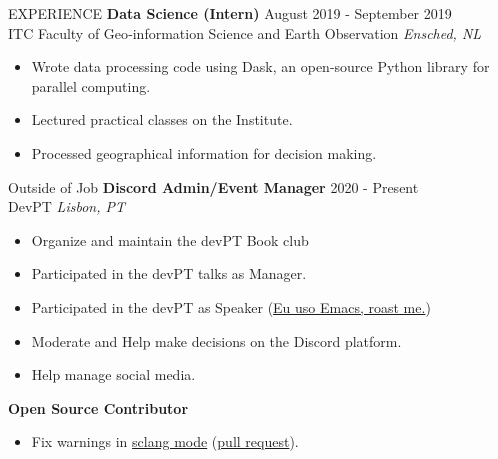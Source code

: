 \documentclass{resume} %
\begin{document}
\begin{rSection}{EXPERIENCE}
  \textbf{Data Science (Intern)} \hfill August 2019 - September 2019 \\
  ITC Faculty of Geo‑information Science and Earth Observation \hfill \textit{Ensched, NL}
  \begin{itemize}
    \itemsep -3pt {} 
  \item Wrote data processing code using Dask, an open-source Python library for parallel computing.
  \item Lectured practical classes on the Institute.
  \item Processed geographical information for decision making.
  \end{itemize}
\end{rSection} 


\begin{rSection}{Outside of Job}  
  \textbf{Discord Admin/Event Manager} \hfill 2020 - Present \\
  DevPT \hfill \textit{Lisbon, PT}
  \begin{itemize}
    \itemsep -3pt {}
  \item Organize and maintain the devPT Book club
  \item Participated in the devPT talks as Manager.
  \item Participated in the devPT as Speaker (\href{https://www.youtube.com/watch?v=p7FrTaukioI&t=2693s}{Eu uso Emacs, roast me.})
  \item Moderate and Help make decisions on the Discord platform.
  \item Help manage social media.
  \end{itemize}

  \textbf{Open Source Contributor}
  \begin{itemize}
    \itemsep -3pt {} 
  \item Fix warnings in \href{https://github.com/supercollider/scel}{sclang mode} (\href{https://github.com/supercollider/scel/pull/63}{pull request}).
  \end{itemize}

\end{rSection}
\end{document}
